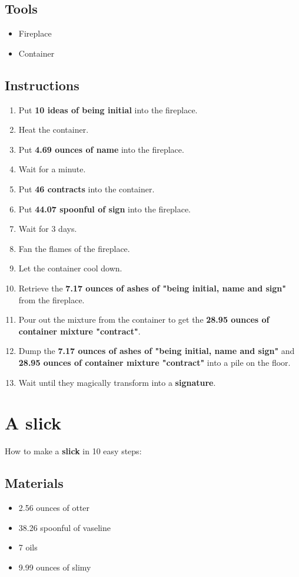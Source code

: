 \documentclass{article}
\begin{document}
\subsection{Tools}\begin{itemize}
\item 
Fireplace
\item 
Container
\end{itemize}
\subsection{Instructions}\begin{enumerate}
\item 
Put \textbf{10 ideas of being initial} into the fireplace.
\item 
Heat the container.
\item 
Put \textbf{4.69 ounces of name} into the fireplace.
\item 
Wait for a minute.
\item 
Put \textbf{46 contracts} into the container.
\item 
Put \textbf{44.07 spoonful of sign} into the fireplace.
\item 
Wait for 3 days.
\item 
Fan the flames of the fireplace.
\item 
Let the container cool down.
\item 
Retrieve the \textbf{7.17 ounces of ashes of "being initial, name and sign"} from the fireplace.
\item 
Pour out the mixture from the container to get the \textbf{28.95 ounces of container mixture "contract"}.
\item 
Dump the \textbf{7.17 ounces of ashes of "being initial, name and sign"} and \textbf{28.95 ounces of container mixture "contract"} into a pile on the floor.
\item 
Wait until they magically transform into a \textbf{signature}.
\end{enumerate}
\newpage
\section{A slick}How to make a \textbf{slick} in 10 easy steps:

\subsection{Materials}\begin{itemize}
\item 
2.56 ounces of otter
\item 
38.26 spoonful of vaseline
\item 
7 oils
\item 
9.99 ounces of slimy
\end{itemize}
\end{document}
